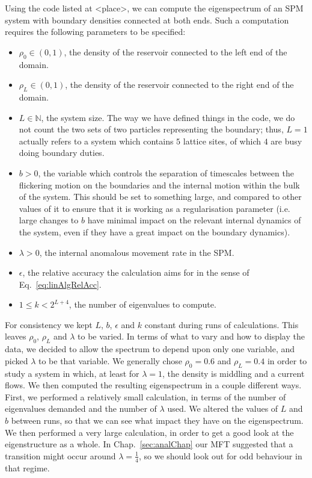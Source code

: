 Using the code listed at <place>, we can compute the eigenspectrum of an SPM system
with boundary densities connected at both ends. Such a computation requires the
following parameters to be specified:
\begin{itemize}
 \item $\rho_0 \in (0, 1)$, the density of the reservoir connected to the left end of the domain.
 \item $\rho_L \in (0, 1)$, the density of the reservoir connected to the right end of the domain.
 \item $L \in \mathbb{N}$, the system size. The way we have defined things in the code, we do not
 count the two sets of two particles representing the boundary; thus, $L=1$ actually
 refers to a system which contains $5$ lattice sites, of which $4$ are busy doing
 boundary duties.
 \item $b>0$, the variable which controls the separation of timescales between the 
 flickering motion on the boundaries and the internal motion within the bulk of the
 system. This should be set to something large, and compared to other values of it
 to ensure that it is working as a regularisation parameter
 (i.e. large changes to $b$ have minimal impact on the relevant internal
 dynamics of the system, even if they have a great impact on the boundary dynamics).
 \item $\lambda>0$, the internal anomalous movement rate in the SPM.
 \item $\epsilon$, the relative accuracy the calculation aims for in the sense of Eq.~\ref{eq:linAlgRelAcc}.
 \item $1 \le k < 2^{L+4}$, the number of eigenvalues to compute.
 \end{itemize}

 For consistency we kept $L$, $b$, $\epsilon$ and $k$ constant during runs of 
 calculations. This leaves $\rho_0$, $\rho_L$ and $\lambda$ to be varied. In terms of what to vary and how to display the data, we decided to
 allow the spectrum to depend upon only one variable, and picked $\lambda$ to be that
 variable. We generally chose $\rho_0 =0.6$ and $\rho_L =0.4$ in order to study a system in which,
 at least for $\lambda=1$, the density is middling and a current flows.
 We then computed the resulting eigenspectrum in a couple different ways.
 First, we performed a relatively small calculation, in terms of the number of eigenvalues demanded and the number of $\lambda$ used. We altered the values of $L$
 and $b$ between runs, so that we can see what impact they have on the eigenspectrum. We then performed a very
 large calculation, in order to get a good look at the eigenstructure as a whole.
 In Chap.~\ref{sec:analChap} our MFT suggested that a transition might occur around
 $\lambda=\frac{1}{4}$, so we should look out for odd behaviour in that regime.

